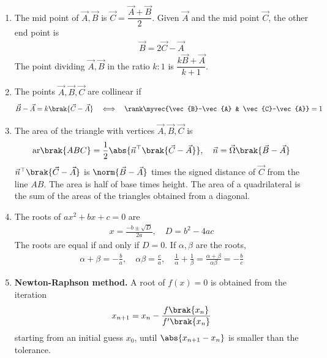 \begin{enumerate}[label=\thesubsection.\arabic*, ref=\thesubsection.\theenumi,itemsep=0pt]
\item The mid point of $\vec{A}, \vec{B}$ is $\vec{C} = \dfrac{\vec{A}+\vec{B}}{2}$. Given $\vec{A}$ and the mid point $\vec{C}$, the other end point is
\begin{align}
\vec{B} = 2\vec{C} - \vec{A}
\label{eq:cb10-mid}
\end{align}
The point dividing $\vec{A}, \vec{B}$ in the ratio $k:1$ is $\dfrac{k\vec{B}+\vec{A}}{k+1}$.

\item The points $\vec{A}, \vec{B}, \vec{C}$ are collinear if
\begin{align}
\vec{B} - \vec{A} = k\brak{\vec{C} - \vec{A}} \quad \Longleftrightarrow \quad \rank\myvec{\vec{B}-\vec{A} & \vec{C}-\vec{A}} = 1
\label{eq:cb10-collinear}
\end{align}

\item The area of the triangle with vertices $\vec{A}, \vec{B}, \vec{C}$ is
\begin{align}
\text{ar}\brak{ABC} = \frac{1}{2}\abs{\vec{n}^{\top}\brak{\vec{C}-\vec{A}}}, \quad \vec{n} = \vec{\Omega}\brak{\vec{B}-\vec{A}}
\label{eq:cb10-area}
\end{align}
\solution $\vec{n}^{\top}\brak{\vec{C}-\vec{A}}$ is $\norm{\vec{B}-\vec{A}}$ times the signed distance of $\vec{C}$ from the line $AB$. The area is half of base times height. The area of a quadrilateral is the sum of the areas of the triangles obtained from a diagonal.

\item The roots of $ax^2 + bx + c = 0$ are
\begin{align}
x = \frac{-b \pm \sqrt{D}}{2a}, \quad D = b^2 - 4ac
\label{eq:cb10-quad}
\end{align}
The roots are equal if and only if $D = 0$. If $\alpha, \beta$ are the roots,
\begin{align}
\alpha + \beta = -\frac{b}{a}, \quad \alpha\beta = \frac{c}{a}, \quad \frac{1}{\alpha} + \frac{1}{\beta} = \frac{\alpha+\beta}{\alpha\beta} = -\frac{b}{c}
\label{eq:cb10-quad-sum}
\end{align}

\item \textbf{Newton-Raphson method.} A root of $f(x) = 0$ is obtained from the iteration
\begin{align}
x_{n+1} = x_n - \frac{f\brak{x_n}}{f'\brak{x_n}}
\label{eq:cb10-nr}
\end{align}
starting from an initial guess $x_0$, until $\abs{x_{n+1}-x_n}$ is smaller than the tolerance.


\end{enumerate}
